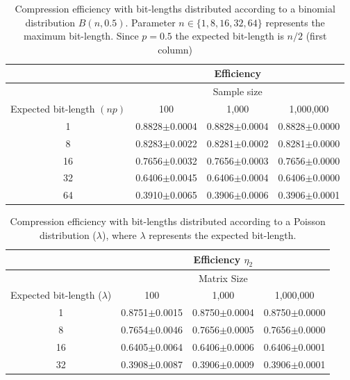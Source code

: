 \documentclass[10pt]{article}
\begin{document}
\begin{table}[h]
  \centering
  \caption{Compression efficiency with bit-lengths distributed according to a 
binomial distribution $B(n,0.5)$. Parameter $n \in \{1, 8, 16, 32, 64 \} $ 
represents the maximum bit-length. Since $p=0.5$ the expected bit-length is 
$n/2$ (first column)}
   \begin{tabular}{cccc}
     \hline
     & &Efficiency& \\
     \hline
     & &Sample size& \\
     Expected bit-length $(np)$ &100 &1,000 &1,000,000 \\
     \hline
     1 &0.8828$\pm$0.0004&0.8828$\pm$0.0004&0.8828$\pm$0.0000\\ 
     8 &0.8283$\pm$0.0022&0.8281$\pm$0.0002&0.8281$\pm$0.0000\\ 
     16&0.7656$\pm$0.0032&0.7656$\pm$0.0003&0.7656$\pm$0.0000\\ 
     32&0.6406$\pm$0.0045&0.6406$\pm$0.0004&0.6406$\pm$0.0000\\ 
     64&0.3910$\pm$0.0065&0.3906$\pm$0.0006&0.3906$\pm$0.0001\\
     \hline
  \end{tabular}
  \label{tab:05}
\end{table}

\begin{table}[h]
  \centering
  \caption{Compression efficiency with bit-lengths distributed according to a 
Poisson distribution ($\lambda$), where $\lambda$ represents the expected 
bit-length.}
  \begin{tabular}{cccc}
      \hline
      &&Efficiency $\eta_2$      & \\
      \hline
      &&Matrix Size& \\
      Expected bit-length ($\lambda$)	& 100	& 1,000	& 1,000,000 \\
      \hline
      1	& 0.8751$\pm$0.0015 	& 0.8750$\pm$0.0004 & 0.8750$\pm$0.0000 \\ 
      8	& 0.7654$\pm$0.0046 	& 0.7656$\pm$0.0005 & 0.7656$\pm$0.0000 \\ 
      16 & 0.6405$\pm$0.0064 	& 0.6406$\pm$0.0006 & 0.6406$\pm$0.0001 \\ 
      32 & 0.3908$\pm$0.0087 	& 0.3906$\pm$0.0009 & 0.3906$\pm$0.0001 \\ 
      \hline
  \end{tabular}
  \label{tab:06}
\end{table}
\end{document}
